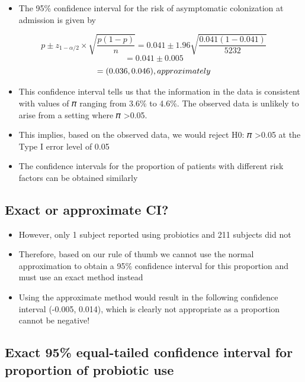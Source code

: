 \documentclass[
]{book}
\providecommand{\tightlist}{%
  \setlength{\itemsep}{0pt}\setlength{\parskip}{0pt}}
\begin{document}
\begin{itemize}
\tightlist
\item
  The 95\% confidence interval for the risk of asymptomatic colonization at admission is given by
\end{itemize}

\[p\pm z_{1-\alpha/2}\times\sqrt{\frac{p(1-p)}{n}}=0.041\pm1.96\sqrt{\frac{0.041(1-0.041)}{5232}}\]
\[=0.041\pm0.005\]
\[=(0.036,0.046),\space approximately\]

\begin{itemize}
\tightlist
\item
  This confidence interval tells us that the information in the data is consistent with values of 𝜋 ranging from 3.6\% to 4.6\%. The observed data is unlikely to arise from a setting where 𝜋 \textgreater0.05.
\item
  This implies, based on the observed data, we would reject H0: 𝜋 \textgreater0.05 at the Type I error level of 0.05
\item
  The confidence intervals for the proportion of patients with different risk factors can be obtained similarly
\end{itemize}

\hypertarget{exact-or-approximate-ci-1}{%
\subsection{Exact or approximate CI?}\label{exact-or-approximate-ci-1}}

\begin{itemize}
\tightlist
\item
  However, only 1 subject reported using probiotics and 211 subjects did not
\item
  Therefore, based on our rule of thumb we cannot use the normal approximation to obtain a 95\% confidence interval for this proportion and must use an exact method instead
\item
  Using the approximate method would result in the following confidence interval (-0.005, 0.014), which is clearly not appropriate as a proportion cannot be negative!
\end{itemize}

\hypertarget{exact-95-equal-tailed-confidence-interval-for-proportion-of-probiotic-use}{%
\subsection{Exact 95\% equal-tailed confidence interval for proportion of probiotic use}\label{exact-95-equal-tailed-confidence-interval-for-proportion-of-probiotic-use}}
\end{document}
